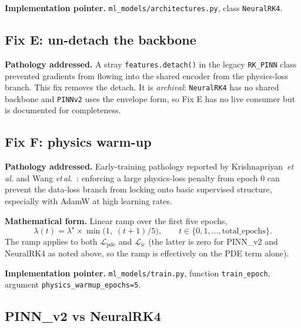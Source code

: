 \documentclass[a4paper,11pt]{article}
\newcommand{\loss}{\mathcal{L}}
\begin{document}
\textbf{Implementation pointer.}
\texttt{ml\_models/architectures.py}, class \texttt{NeuralRK4}.

\subsection{Fix E: un-detach the backbone}

\textbf{Pathology addressed.} A stray \texttt{features.detach()} in
the legacy \texttt{RK\_PINN} class prevented gradients from flowing
into the shared encoder from the physics-loss branch. This fix
removes the detach. It is \emph{archival}: \texttt{NeuralRK4} has no
shared backbone and \texttt{PINNv2} uses the envelope form, so Fix E
has no live consumer but is documented for completeness.

\subsection{Fix F: physics warm-up}

\textbf{Pathology addressed.} Early-training pathology reported by
Krishnapriyan~\emph{et\,al.} \cite{Krishnapriyan2021} and Wang
\emph{et\,al.}~\cite{WangTengPerdikaris2021}: enforcing a large
physics-loss penalty from epoch 0 can prevent the data-loss branch
from locking onto basic supervised structure, especially with AdamW
at high learning rates.

\textbf{Mathematical form.} Linear ramp over the first five epochs,
\begin{equation}
\lambda(t)=\lambda^\star\times\min\!\bigl(1,\;(t+1)/5\bigr),\qquad
t\in\{0,1,\dots,\mathrm{total\_epochs}\}.
\end{equation}
The ramp applies to both $\loss_{\mathrm{pde}}$ and
$\loss_{\mathrm{ic}}$ (the latter is zero for PINN\_v2 and NeuralRK4
as noted above, so the ramp is effectively on the PDE term alone).

\textbf{Implementation pointer.}
\texttt{ml\_models/train.py}, function \texttt{train\_epoch}, argument
\texttt{physics\_warmup\_epochs=5}.

\subsection{PINN\_v2 vs NeuralRK4}
\end{document}
